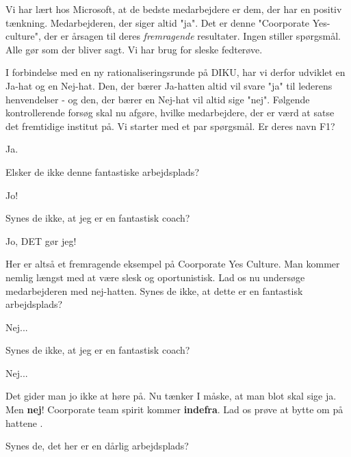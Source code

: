 \documentclass[a4paper,11pt]{article}
\begin{document}
 \begin{sketch}

 Vi har lært hos Microsoft, at de bedste medarbejdere er dem,
der har en positiv tænkning. Medarbejderen, der siger altid "ja". Det
er denne "Coorporate Yes-culture", der er årsagen til deres
\emph{fremragende} resultater. Ingen stiller spørgsmål. Alle gør som der
bliver sagt. Vi har brug for sleske fedterøve.

I forbindelse med en ny rationaliseringsrunde på DIKU, har vi derfor
udviklet en Ja-hat og en Nej-hat. Den, der bærer Ja-hatten altid vil
svare "ja" til lederens henvendelser - og den, der bærer en Nej-hat
vil altid sige "nej". Følgende kontrollerende forsøg skal nu afgøre,
hvilke medarbejdere, der er værd at satse det fremtidige institut
på.  Vi starter
med et par spørgsmål.  Er deres navn F1?


 Ja.

 Elsker de ikke denne fantastiske arbejdsplads?

  Jo!  

 Synes de ikke, at jeg er en fantastisk coach?

  Jo, DET gør jeg!

 
Her er altså et fremragende eksempel på Coorporate Yes Culture. Man
kommer nemlig længst med at være slesk og oportunistisk. Lad os nu
undersøge medarbejderen med nej-hatten. 
Synes de ikke, at dette er en fantastisk arbejdsplads?

 Nej...  

 Synes de ikke, at jeg er en fantastisk coach?

 Nej... 

  Det gider man jo ikke at høre på. Nu tænker I måske, at
man blot skal sige ja. Men \textbf{nej}! Coorporate team spirit kommer
\textbf{indefra}. Lad os prøve at bytte om på hattene . 


  Synes de, det her er en dårlig arbejdsplads?


\end{sketch}
\end{document}
